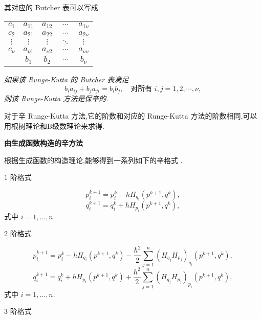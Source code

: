 其对应的 Butcher 表可以写成

\begin{center}
  \begin{tabular}{c|cccc}
    $c_1$&$a_{11}$&$a_{12}$&$\cdots$&$a_{1\nu}$\\
    $c_2$&$a_{21}$&$a_{22}$&$\cdots$&$a_{2\nu}$\\
    $\vdots$&$\vdots$&$\vdots$&$\ddots$&$\vdots$\\
    $c_{\nu}$&$a_{\nu 1}$&$a_{\nu 2}$&$\cdots$&$a_{\nu \nu}$\\
    \hline
         &$b_{1}$&$b_{2}$&$\cdots$&$b_{\nu}$
  \end{tabular}
\end{center}

\begin{theorem}
\emph{如果该 Runge-Kutta 的 Butcher 表满足
\begin{equation*}
  b_ia_{ij}+b_ja_{ji}=b_ib_j,\quad \textrm{对所有}\,\, i,j=1,2,\cdots,\nu,
\end{equation*}
则该 Runge-Kutta 方法是保辛的.}
\end{theorem}

对于辛 Runge-Kutta 方法,它的阶数和对应的 Runge-Kutta 方法的阶数相同,可以用根树理论和B级数理论来求得.

\noindent \textbf{由生成函数构造的辛方法}

根据生成函数的构造理论,能够得到一系列如下的辛格式 \cite{feng2003sym}.

$1$ 阶格式

\begin{equation*}
	p_i^{k+1}= p_i^{k}-hH_{q_i}(p^{k+1},q^{k}),
\end{equation*}
\begin{equation*}
	q_i^{k+1}= q_i^{k}+hH_{p_i}(p^{k+1},q^{k}),
\end{equation*}
式中 $i=1,\ldots,n$.

$2$ 阶格式

\begin{equation*}
	p_i^{k+1}= p_i^{k}-hH_{q_i}(p^{k+1},q^{k})-\frac{h^2}{2}\sum_{j=1}^n(H_{q_j}H_{p_j})_{q_i}(p^{k+1},q^{k}),
\end{equation*}
\begin{equation*}
	q_i^{k+1}= q_i^{k}+hH_{p_i}(p^{k+1},q^{k})+\frac{h^2}{2}\sum_{j=1}^n(H_{q_j}H_{p_j})_{p_i}(p^{k+1},q^{k}),
\end{equation*}
式中 $i=1,\ldots,n$.

$3$ 阶格式

